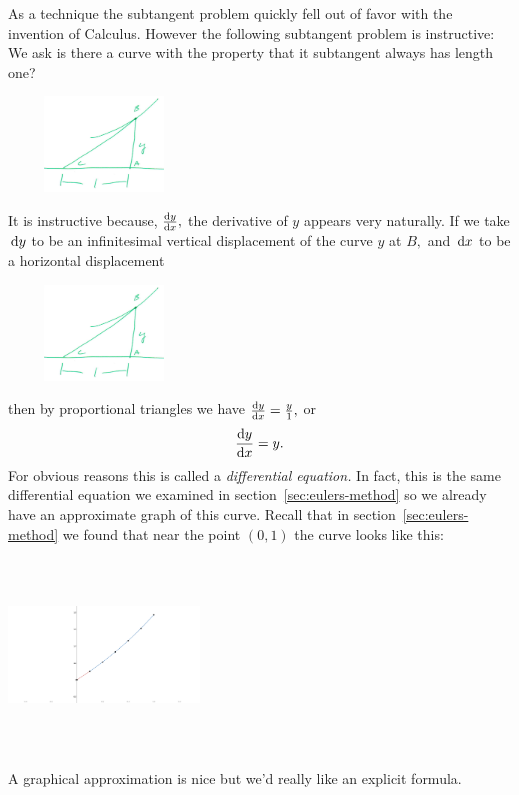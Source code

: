 As a technique the subtangent problem quickly fell out of favor with
the invention of Calculus. However the following subtangent problem is
instructive: We ask is there a curve with the property that it
subtangent always has length one?\\
\centerline{\includegraphics*[height=1in,width=2in]{Figures/subtan2}}
It is instructive because, $\frac{\text{d}{y}}{\text{d}{x}},$ the derivative of $y$
appears very naturally. If we take $\thinspace{\rm d}y$ to be an infinitesimal
vertical displacement of the curve $y$ at $B,$ and $\thinspace{\rm d}x$ to be a
horizontal displacement\\
\centerline{\includegraphics*[height=1in,width=2in]{Figures/subtan3}}
then by proportional triangles we have $\frac{\text{d}{y}}{\text{d}{x}} = \frac{y}{1},$ or
\begin{equation}
  \label{eq:ExpDiffeq}
  \frac{\text{d}{y}}{\text{d}{x}} = y.
\end{equation}
For obvious reasons this is called a \emph{differential equation.} In
fact, this is the same differential equation we examined in
section~\ref{sec:eulers-method} so we already have an approximate
graph of this curve. Recall that in section~\ref{sec:eulers-method} we
found that near the point $(0,1)$ the curve looks like this:
\centerline{\includegraphics*[height=2in,width=2in]{Figures/exp-piecewise-linear}}
A graphical approximation is nice but we'd really like an explicit formula. 


